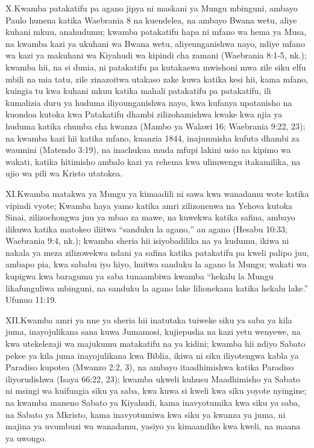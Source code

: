 \lettrine{X.} Kwamba patakatifu pa agano jipya ni maskani ya Mungu mbinguni, ambayo Paulo hunena katika Waebrania 8 na kuendelea, na ambayo Bwana wetu, aliye kuhani mkuu, anahudumu; kwamba patakatifu hapa ni mfano wa hema ya Musa, na kwamba kazi ya ukuhani wa Bwana wetu, aliyeunganishwa nayo, ndiye mfano wa kazi ya makuhani wa Kiyahudi wa kipindi cha zamani (Waebrania 8:1-5, nk.); kwamba hii, na si dunia, ni patakatifu pa kutakaswa mwishoni mwa zile siku elfu mbili na mia tatu, zile zinazoitwa utakaso zake kuwa katika kesi hii, kama mfano, kuingia tu kwa kuhani mkuu katika mahali patakatifu pa patakatifu, ili kumalizia duru ya huduma iliyounganishwa nayo, kwa kufanya upatanisho na kuondoa kutoka kwa Patakatifu dhambi zilizohamishwa kwake kwa njia ya huduma katika chumba cha kwanza (Mambo ya Walawi 16; Waebrania 9:22, 23); na kwamba kazi hii katika mfano, kuanzia 1844, inajumuisha kufuta dhambi za waumini (Matendo 3:19), na inachukua muda mfupi lakini usio na kipimo wa wakati, katika hitimisho ambalo kazi ya rehema kwa ulimwengu itakamilika, na ujio wa pili wa Kristo utatokea.

\lettrine{XI.} Kwamba matakwa ya Mungu ya kimaadili ni sawa kwa wanadamu wote katika vipindi vyote; Kwamba haya yamo katika amri zilizonenwa na Yehova kutoka Sinai, zilizochongwa juu ya mbao za mawe, na kuwekwa katika safina, ambayo ilikuwa katika matokeo iliitwa “sanduku la agano,” au agano (Hesabu 10:33; Waebrania 9:4, nk.); kwamba sheria hii isiyobadilika na ya kudumu, ikiwa ni nakala ya meza zilizowekwa ndani ya safina katika patakatifu pa kweli palipo juu, ambapo pia, kwa sababu iyo hiyo, huitwa sanduku la agano la Mungu; wakati wa kupigwa kwa baragumu ya saba tunaambiwa kwamba “hekalu la Mungu likafunguliwa mbinguni, na sanduku la agano lake lilionekana katika hekalu lake.” Ufunuo 11:19.

\lettrine{XII.} Kwamba amri ya nne ya sheria hii inatutaka tuiweke siku ya saba ya kila juma, inayojulikana sana kuwa Jumamosi, kujiepusha na kazi yetu wenyewe, na kwa utekelezaji wa majukumu matakatifu na ya kidini; kwamba hii ndiyo Sabato pekee ya kila juma inayojulikana kwa Biblia, ikiwa ni siku iliyotengwa kabla ya Paradiso kupotea (Mwanzo 2:2, 3), na ambayo itaadhimishwa katika Paradiso iliyorudishwa (Isaya 66:22, 23); kwamba ukweli kuhusu Maadhimisho ya Sabato ni msingi wa kuifungia siku ya saba, kwa kuwa si kweli kwa siku yoyote nyingine; na kwamba maneno Sabato ya Kiyahudi, kama inavyotumika kwa siku ya saba, na Sabato ya Mkristo, kama inavyotumiwa kwa siku ya kwanza ya juma, ni majina ya uvumbuzi wa wanadamu, yasiyo ya kimaandiko kwa kweli, na maana ya uwongo.


